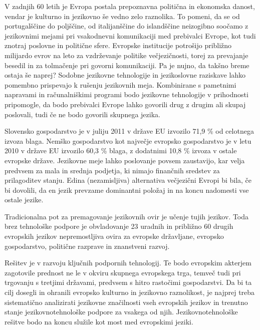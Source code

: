 \begin{multicols}{2}

V zadnjih 60 letih je Evropa postala prepoznavna politična in ekonomska danost, vendar je kulturno in jezikovno še vedno zelo raznolika. To pomeni, da se od portugalščine do poljščine, od italijanščine do islandščine neizogibno soočamo z jezikovnimi mejami pri vsakodnevni komunikaciji med prebivalci Evrope, kot tudi znotraj poslovne in politične sfere. Evropske institucije potrošijo približno milijardo evrov na leto za vzdrževanje politike večjezičnosti, torej za prevajanje besedil in za tolmačenje pri govorni komunikaciji. Pa je nujno, da takšno breme ostaja še naprej? Sodobne jezikovne tehnologije in jezikoslovne raziskave lahko pomembno prispevajo k rušenju jezikovnih meja. Kombinirane s pametnimi napravami in računalniškimi programi bodo jezikovne tehnologije v prihodnosti pripomogle, da bodo prebivalci Evrope lahko govorili drug z drugim ali skupaj poslovali, tudi če ne bodo govorili skupnega jezika.


Slovensko gospodarstvo je v juliju 2011 v države EU izvozilo 71,9 \% od celotnega izvoza blaga. Nemško gospodarstvo kot največje evropsko gospodarstvo je v letu 2010 v države EU izvozilo 60,3 \% blaga, z dodatnimi 10,8 \% izvoza v ostale evropske države. Jezikovne meje lahko poslovanje povsem zaustavijo, kar velja predvsem za mala in srednja podjetja, ki nimajo finančnih sredstev za prilagoditev stanju. Edina (nezamisljiva) alternativa večjezični Evropi bi bila, če bi dovolili, da en jezik prevzame dominantni položaj in na koncu nadomesti vse ostale jezike. 

Tradicionalna pot za premagovanje jezikovnih ovir je učenje tujih jezikov. Toda brez tehnološke podpore je obvladovanje 23 uradnih in približno 60 drugih evropskih jezikov nepremostljiva ovira za evropske državljane, evropsko gospodarstvo, politične razprave in znanstveni razvoj. 

Rešitev je v razvoju ključnih podpornih tehnologij. Te bodo evropskim akterjem zagotovile prednost ne le v okviru skupnega evropskega trga, temveč tudi pri trgovanju s tretjimi državami, predvsem s hitro rastočimi gospodarstvi. Da bi ta cilj dosegli in ohranili evropsko kulturno in jezikovno raznolikost, je najprej treba sistematično analizirati jezikovne značilnosti vseh evropskih jezikov in trenutno stanje jezikovnotehnološke podpore za vsakega od njih. Jezikovnotehnološke rešitve bodo na koncu služile kot most med evropskimi jeziki.


\end{multicols}

